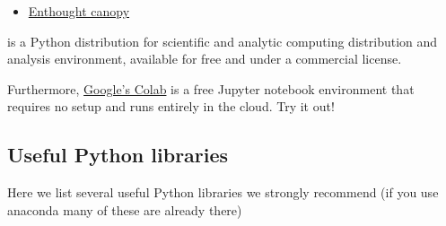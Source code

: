 \documentclass[%
oneside,                 %
final,                   %
10pt]{article}
\begin{document}
\begin{itemize}
\item \href{{https://www.enthought.com/product/canopy/}}{Enthought canopy} 
\end{itemize}

\noindent
is a Python
distribution for scientific and analytic computing distribution and
analysis environment, available for free and under a commercial
license.

Furthermore, \href{{https://colab.research.google.com/notebooks/welcome.ipynb}}{Google's Colab} is a free Jupyter notebook environment that requires 
no setup and runs entirely in the cloud. Try it out!

\subsection*{Useful Python libraries}
Here we list several useful Python libraries we strongly recommend (if you use anaconda many of these are already there)
\end{document}
